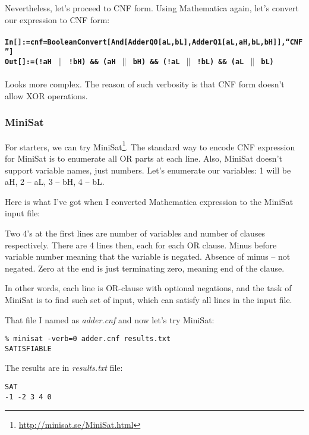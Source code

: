 Nevertheless, let's proceed to \ac{CNF} form. Using Mathematica again, let's convert our expression to \ac{CNF} form:\\
\\
\textbf{\texttt{In[]:=cnf=BooleanConvert[And[AdderQ0[aL,bL],AdderQ1[aL,aH,bL,bH]],``CNF'']}} \\
\textbf{\texttt{Out[]:=(!aH $\|$ !bH) \&\& (aH $\|$ bH) \&\& (!aL $\|$ !bL) \&\& (aL $\|$ bL)}} \\
\\
Looks more complex. The reason of such verbosity is that \ac{CNF} form doesn't allow XOR operations.

\subsubsection{MiniSat}

For starters, we can try MiniSat\footnote{\url{http://minisat.se/MiniSat.html}}.
The standard way to encode \ac{CNF} expression for MiniSat is to enumerate all OR parts at each line.
Also, MiniSat doesn't support variable names, just numbers.
Let's enumerate our variables: 1 will be aH, 2 -- aL, 3 -- bH, 4 -- bL.

Here is what I've got when I converted Mathematica expression to the MiniSat input file:



Two 4's at the first lines are number of variables and number of clauses respectively.
There are 4 lines then, each for each OR clause.
Minus before variable number meaning that the variable is negated.
Absence of minus -- not negated.
Zero at the end is just terminating zero, meaning end of the clause.

In other words, each line is OR-clause with optional negations,
and the task of MiniSat is to find such set of input, which can satisfy all lines in the input file.

That file I named as \textit{adder.cnf} and now let's try MiniSat:

\begin{lstlisting}
% minisat -verb=0 adder.cnf results.txt
SATISFIABLE
\end{lstlisting}

The results are in \textit{results.txt} file:

\begin{lstlisting}
SAT
-1 -2 3 4 0
\end{lstlisting}


